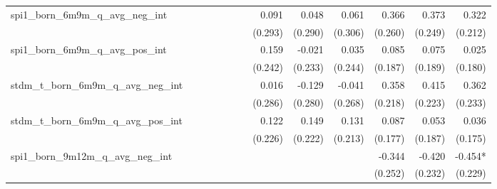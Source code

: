 \begin{tabular}{lrrrrrrrrrrrr}
spi1\_born\_6m9m\_q\_avg\_neg\_int          &              &              &              &              &              &              &        0.091 &        0.048 &        0.061 &        0.366 &        0.373 &        0.322 \\ 
                                            &              &              &              &              &              &              &      (0.293) &      (0.290) &      (0.306) &      (0.260) &      (0.249) &      (0.212) \\ 
spi1\_born\_6m9m\_q\_avg\_pos\_int          &              &              &              &              &              &              &        0.159 &       -0.021 &        0.035 &        0.085 &        0.075 &        0.025 \\ 
                                            &              &              &              &              &              &              &      (0.242) &      (0.233) &      (0.244) &      (0.187) &      (0.189) &      (0.180) \\ 
stdm\_t\_born\_6m9m\_q\_avg\_neg\_int       &              &              &              &              &              &              &        0.016 &       -0.129 &       -0.041 &        0.358 &        0.415 &        0.362 \\ 
                                            &              &              &              &              &              &              &      (0.286) &      (0.280) &      (0.268) &      (0.218) &      (0.223) &      (0.233) \\ 
stdm\_t\_born\_6m9m\_q\_avg\_pos\_int       &              &              &              &              &              &              &        0.122 &        0.149 &        0.131 &        0.087 &        0.053 &        0.036 \\ 
                                            &              &              &              &              &              &              &      (0.226) &      (0.222) &      (0.213) &      (0.177) &      (0.187) &      (0.175) \\ 
spi1\_born\_9m12m\_q\_avg\_neg\_int         &              &              &              &              &              &              &              &              &              &       -0.344 &       -0.420 &      -0.454* \\ 
                                            &              &              &              &              &              &              &              &              &              &      (0.252) &      (0.232) &      (0.229) \\ 

\end{tabular}
